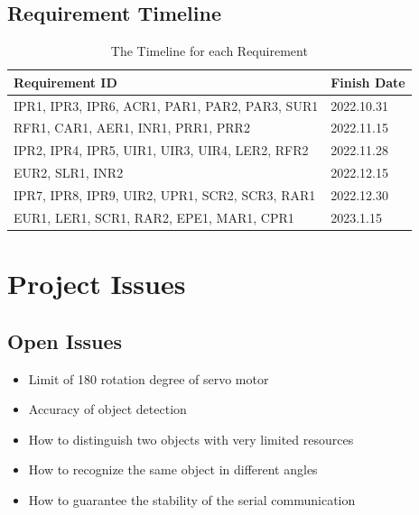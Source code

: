\documentclass[12pt]{article}
\begin{document}
\subsection{Requirement Timeline}
\begin{table}[H]
\begin{tabular}{|p{}|p{}|}

\hline Requirement ID&Finish Date\\


\hline IPR1, IPR3, IPR6, ACR1, PAR1, PAR2, PAR3, SUR1&2022.10.31\\

\hline RFR1, CAR1, AER1, INR1, PRR1, PRR2&2022.11.15\\

\hline IPR2, IPR4, IPR5, UIR1, UIR3, UIR4, LER2, RFR2&2022.11.28\\

\hline EUR2, SLR1, INR2&2022.12.15\\

\hline IPR7, IPR8, IPR9, UIR2, UPR1, SCR2, SCR3, RAR1&2022.12.30\\

\hline EUR1, LER1, SCR1, RAR2, EPE1, MAR1, CPR1&2023.1.15\\

\hline

\end{tabular}
\caption{The Timeline for each Requirement}
\end{table}


\section{Project Issues}

\subsection{Open Issues}

\begin{itemize}
    \item Limit of 180 rotation degree of servo motor
    \item Accuracy of object detection 
    \item How to distinguish two objects with very limited resources
    \item How to recognize the same object in different angles
    \item How to guarantee the stability of the serial communication
\end{itemize}
\end{document}
